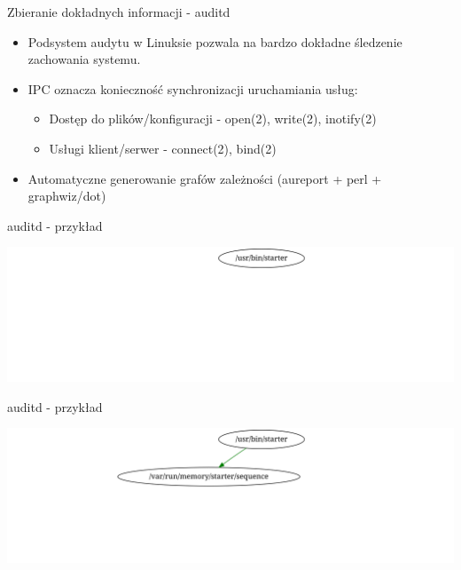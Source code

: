 \documentclass[presentation,aspectratio=43,12pt]{beamer}
\begin{document}
\begin{frame}[label=sec-4-5]{Zbieranie dokładnych informacji - auditd}
\begin{itemize}
\item Podsystem audytu w Linuksie pozwala na bardzo dokładne śledzenie
zachowania systemu.

\item <2-> IPC oznacza konieczność synchronizacji uruchamiania usług:
\begin{itemize}
\item Dostęp do plików/konfiguracji - open(2), write(2), inotify(2)
\item Usługi klient/serwer - connect(2), bind(2)
\end{itemize}

\item <3-> Automatyczne generowanie grafów zależności (aureport +
perl + graphwiz/dot)
\end{itemize}

\end{frame}
\begin{frame}[label=sec-4-6]{auditd - przykład}
\begin{center}
\includegraphics[width=\textwidth]{images/auditd-0}
\end{center}
\end{frame}
\begin{frame}[label=sec-4-7]{auditd - przykład}
\begin{center}
\includegraphics[width=\textwidth]{images/auditd-1}
\end{center}
\end{frame}
\end{document}
